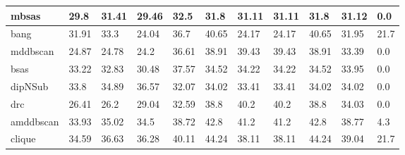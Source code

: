 \begin{table}[H]
\begin{tabular}{|l|l|l|l|l|l|l|l|l|l|l|}
\\\hline
mbsas & 29.8 & 31.41 & 29.46 & 32.5 & 31.8 & 31.11 & 31.11 & 31.8 & 31.12 & 0.0%
\\\hline
bang & 31.91 & 33.3 & 24.04 & 36.7 & 40.65 & 24.17 & 24.17 & 40.65 & 31.95 & 21.7%
\\\hline
mddbscan & 24.87 & 24.78 & 24.2 & 36.61 & 38.91 & 39.43 & 39.43 & 38.91 & 33.39 & 0.0%
\\\hline
bsas & 33.22 & 32.83 & 30.48 & 37.57 & 34.52 & 34.22 & 34.22 & 34.52 & 33.95 & 0.0%
\\\hline
dipNSub & 33.8 & 34.89 & 36.57 & 32.07 & 34.02 & 33.41 & 33.41 & 34.02 & 34.02 & 0.0%
\\\hline
drc & 26.41 & 26.2 & 29.04 & 32.59 & 38.8 & 40.2 & 40.2 & 38.8 & 34.03 & 0.0%
\\\hline
amddbscan & 33.93 & 35.02 & 34.5 & 38.72 & 42.8 & 41.2 & 41.2 & 42.8 & 38.77 & 4.3%
\\\hline
clique & 34.59 & 36.63 & 36.28 & 40.11 & 44.24 & 38.11 & 38.11 & 44.24 & 39.04 & 21.7%
\\\hline
\end{tabular}
\end{table}